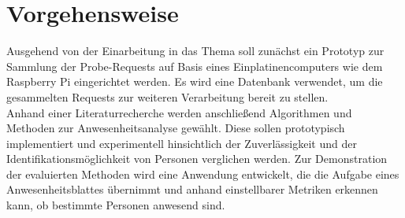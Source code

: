\section{Vorgehensweise}

Ausgehend von der Einarbeitung in das Thema soll zunächst ein Prototyp zur Sammlung der Probe-Requests auf Basis eines Einplatinencomputers wie dem Raspberry Pi eingerichtet werden.
Es wird eine Datenbank verwendet, um die gesammelten Requests zur weiteren Verarbeitung bereit zu stellen.
\\

Anhand einer Literaturrecherche werden anschließend Algorithmen und Methoden zur Anwesenheitsanalyse gewählt.
Diese sollen prototypisch implementiert und experimentell hinsichtlich der Zuverlässigkeit und der Identifikationsmöglichkeit von Personen verglichen werden.
Zur Demonstration der evaluierten Methoden wird eine Anwendung entwickelt, die die Aufgabe eines Anwesenheitsblattes übernimmt und anhand einstellbarer Metriken erkennen kann, ob bestimmte Personen anwesend sind.